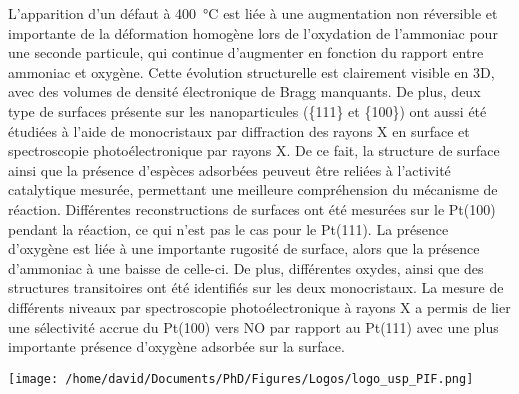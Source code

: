 \begin{mdframed}[linecolor=Prune,linewidth=1]
\begin{multicols}{2}
L'apparition d'un défaut à \qty{400}{\degreeCelsius} est liée à une augmentation non réversible et importante de la déformation homogène lors de l'oxydation de l'ammoniac pour une seconde particule, qui continue d'augmenter en fonction du rapport entre ammoniac et oxygène.
Cette évolution structurelle est clairement visible en 3D, avec des volumes de densité électronique de Bragg manquants.
De plus, deux type de surfaces présente sur les nanoparticules (\{111\} et \{100\}) ont aussi été étudiées à l'aide de monocristaux par diffraction des rayons X en surface et spectroscopie photoélectronique par rayons X.
De ce fait, la structure de surface ainsi que la présence d'espèces adsorbées peuveut être reliées à l'activité catalytique mesurée, permettant une meilleure compréhension du mécanisme de réaction.
Différentes reconstructions de surfaces ont été mesurées sur le Pt(100) pendant la réaction, ce qui n'est pas le cas pour le Pt(111).
La présence d'oxygène est liée à une importante rugosité de surface, alors que la présence d'ammoniac à une baisse de celle-ci.
De plus, différentes oxydes, ainsi que des structures transitoires ont été identifiés sur les deux monocristaux.
La mesure de différents niveaux par spectroscopie photoélectronique à rayons X a permis de lier une sélectivité accrue du Pt(100) vers NO par rapport au Pt(111) avec une plus importante présence d'oxygène adsorbée sur la surface.
\end{multicols}

\end{mdframed}

\newpage
\thispagestyle{empty}

\lhead{}
\rhead{}
\rfoot{}
\cfoot{}
\lfoot{}

\noindent
\texttt{[image: /home/david/Documents/PhD/Figures/Logos/logo\_usp\_PIF.png]}
\vspace{0.5cm}

\small

